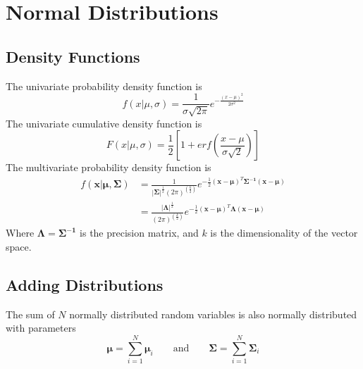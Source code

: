 \documentclass[../../main.tex]{subfiles}
\begin{document}
\chapter{Normal Distributions}
\section{Density Functions}
The univariate probability density function is
\begin{equation}
    \label{eq:uninormaldens}
    f\left(x| \mu, \sigma \right) =
    \frac{1}{\sigma\sqrt{2\pi}}e^{-\frac{(x - \mu)^2}{2\sigma^2}}
\end{equation}
The univariate cumulative density function is
\begin{equation}
    \label{eq:uninormalcum}
    F\left(x| \mu, \sigma \right) =
    \frac{1}{2}\left[ 1 + erf\left(\frac{x - \mu}{\sigma \sqrt{2}}  \right) \right]
\end{equation}
The multivariate probability density function is
\begin{align}
    \label{eq:multinormaldens}
    f\left(\boldsymbol{x}| \boldsymbol{\mu}, \boldsymbol{\Sigma} \right)
    &= \frac{1}{
            |\boldsymbol{\Sigma}|^\frac{1}{2} (2\pi)^{\left(\frac{k}{2}\right)}
        }
        e^{
            -\frac{1}{2}
            (\boldsymbol{x} - \boldsymbol{\mu})^T
            \boldsymbol{\Sigma^{-1}}
            (\boldsymbol{x} - \boldsymbol{\mu})
    }\\
    &= \frac{|\boldsymbol{\Lambda}|^\frac{1}{2}}{
             (2\pi)^{\left(\frac{k}{2}\right)}
        }
        e^{
            -\frac{1}{2}
            (\boldsymbol{x} - \boldsymbol{\mu})^T
            \boldsymbol{\Lambda}
            (\boldsymbol{x} - \boldsymbol{\mu})
    }\nonumber
\end{align}
Where $\boldsymbol{\Lambda} = \boldsymbol{\Sigma^{-1}}$ is the precision
matrix, and $k$ is the dimensionality of the vector space.


\section{Adding Distributions}
The sum of $N$ normally distributed random variables is also normally
distributed with parameters
\begin{equation}
    \label{eq:sum_normal_mu_var}
    \boldsymbol\mu = \sum\limits_{i=1}^{N}\boldsymbol\mu_i
    \qquad\text{and}\qquad
    \boldsymbol\Sigma = \sum\limits_{i=1}^{N}\boldsymbol\Sigma_i
\end{equation}
\end{document}
